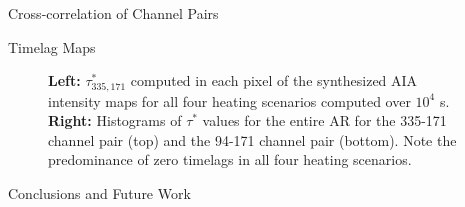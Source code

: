 \documentclass[final]{beamer}
\begin{document}
\begin{frame}
\begin{columns}[T]
\begin{column}{0.49\linewidth}
\begin{block}{Cross-correlation of Channel Pairs}
        \vspace{-3ex}
    \end{block}
    \begin{block}{Timelag Maps}
        \vspace{-2ex}
        \begin{figure}
            \caption{\textbf{Left:} $\tau^*_{335,171}$ computed in each pixel of the synthesized AIA intensity maps for all four heating scenarios computed over $10^4$ s. \textbf{Right:} Histograms of $\tau^*$ values for the entire AR for the 335-171 channel pair (top) and the 94-171 channel pair (bottom). Note the predominance of zero timelags in all four heating scenarios.}
            \label{fig:timelags}
        \end{figure}
        \vspace{-2ex}
    \end{block}
    \begin{block}{Conclusions and Future Work}

\end{block}
\end{column}
\end{columns}
\end{frame}
\end{document}
